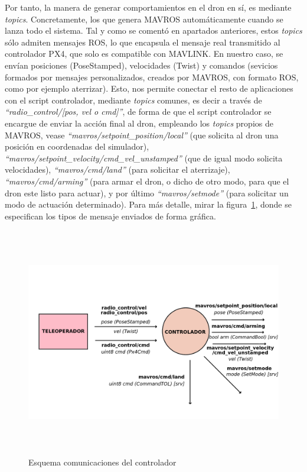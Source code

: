 Por tanto, la manera de generar comportamientos en el dron en sí, es mediante \emph{topics}. Concretamente, los que genera MAVROS automáticamente cuando se lanza todo el sistema. Tal y como se comentó en apartados anteriores, estos \emph{topics} sólo admiten mensajes \ac{ROS}, lo que encapsula el mensaje real transmitido al controlador PX4, que solo es compatible con MAVLINK. En nuestro caso, se envían posiciones (PoseStamped), velocidades (Twist) y comandos (sevicios formados por mensajes personalizados, creados por MAVROS, con formato \ac{ROS}, como por ejemplo aterrizar). Esto, nos permite conectar el resto de aplicaciones con el script controlador, mediante \emph{topics} comunes, es decir a través de \emph{``radio\_control/[pos, vel o cmd]''}, de forma de que el script controlador se encargue de enviar la acción final al dron, empleando los \emph{topics} propios de MAVROS, vease \emph{``mavros/setpoint\_position/local''} (que solicita al dron una posición en coordenadas del simulador), \emph{``mavros/setpoint\_velocity/cmd\_vel\_unstamped''} (que de igual modo solicita velocidades), \emph{``mavros/cmd/land''} (para solicitar el aterrizaje), \emph{``mavros/cmd/arming''} (para armar el dron, o dicho de otro modo, para que el dron este listo para actuar), y por último \emph{``mavros/setmode''} (para solicitar un modo de actuación determinado). Para más detalle, mirar la figura~\ref{fig:diagrama2}, donde se especifican los tipos de mensaje enviados de forma gráfica.\\

\begin{figure} [t]
	\begin{center}
	\includegraphics[height=10cm]{imagenes/cap4/4_esquema_coms.png}
	\end{center}
	\caption[Esquema comunicaciones del controlador]{Esquema comunicaciones del controlador}
	\label{fig:diagrama2}
\end{figure}

